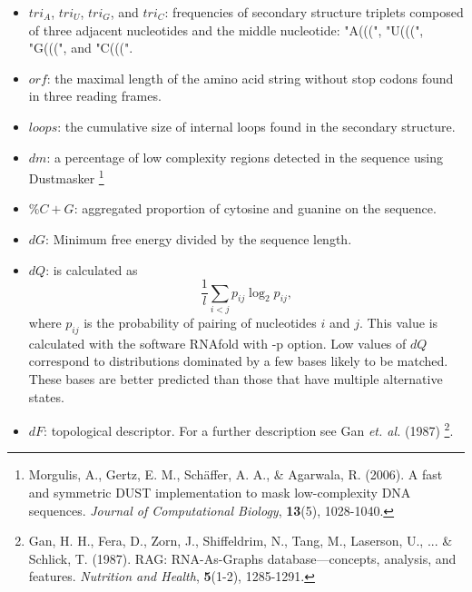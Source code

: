 \documentclass[]{scrartcl}
\begin{document}
\begin{itemize}
	\item $tri_A$, $tri_U$, $tri_G$, and $tri_C$: frequencies of secondary structure triplets composed of three adjacent nucleotides and the middle nucleotide: "A(((", "U(((", "G(((", and "C(((".
	\item $orf$: the maximal length of the amino acid string without stop codons found in three reading frames.
	\item $loops$: the cumulative size of internal loops found in the secondary structure.
	\item $dm$: a percentage of low complexity regions detected in the sequence using Dustmasker \footnote{Morgulis, A., Gertz, E. M., Schäffer, A. A., \& Agarwala, R. (2006). A fast and symmetric DUST implementation to mask low-complexity DNA sequences. \textit{Journal of Computational Biology}, \textbf{13}(5), 1028-1040.}
	\item $\%C + G$: aggregated proportion of cytosine and guanine on the sequence.
	\item $dG$: Minimum free energy divided by the sequence length.
	\item $dQ$: is calculated as $$\frac{1}{l} \sum_{i<j} p_{ij} \log_2 p_{ij} , $$	where $p_{ij}$ is the probability of pairing of nucleotides $i$ and $j$. This value is calculated with the software RNAfold with -p option. Low values of $dQ$ correspond to distributions dominated by a few bases likely to be matched. These bases are better predicted than those that have multiple alternative states.
	\item $dF$: topological descriptor. For a further description see Gan \textit{et. al.} (1987)
	\footnote{Gan, H. H., Fera, D., Zorn, J., Shiffeldrim, N., Tang, M., Laserson, U., ... \& Schlick, T. (1987). RAG: RNA-As-Graphs database—concepts, analysis, and features. \textit{Nutrition and Health}, \textbf{5}(1-2), 1285-1291.}.


\end{itemize}
\end{document}
